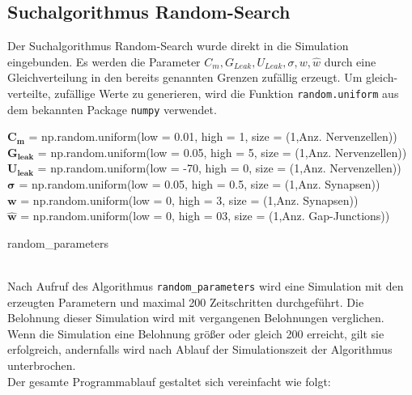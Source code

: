 	\subsection{Suchalgorithmus Random-Search}
		Der Suchalgorithmus Random-Search wurde direkt in die Simulation eingebunden. Es werden die Parameter $C_m, G_{Leak}, U_{Leak}, \sigma, w, \hat{w}$ durch eine Gleichverteilung in den bereits genannten Grenzen zufällig erzeugt. Um gleich-verteilte, zufällige Werte zu generieren, wird die Funktion \texttt{random.uniform} aus dem bekannten Package \texttt{numpy} \cite{NumPy} verwendet.\\
		\begin{algorithm}
			
				$\boldsymbol{C_m}$ = np.random.uniform(low = 0.01, high = 1, size = (1,Anz. Nervenzellen))\\
				$\boldsymbol{G_{leak}}$ = np.random.uniform(low = 0.05, high = 5, size = (1,Anz. Nervenzellen))\\
				$\boldsymbol{U_{leak}}$ = np.random.uniform(low = -70, high = 0, size = (1,Anz. Nervenzellen))\\
				$\boldsymbol{\sigma}$ = np.random.uniform(low = 0.05, high = 0.5, size = (1,Anz. Synapsen))\\
				$\boldsymbol{w}$ = np.random.uniform(low = 0, high = 3, size = (1,Anz. Synapsen))\\
				$\boldsymbol{\hat{w}}$ = np.random.uniform(low = 0, high = 03, size = (1,Anz. Gap-Junctions))
			\caption{random\_parameters}
		\end{algorithm}\\
		Nach Aufruf des Algorithmus \texttt{random\_parameters} wird eine Simulation mit den erzeugten Parametern und maximal 200 Zeitschritten durchgeführt. Die Belohnung dieser Simulation wird mit vergangenen Belohnungen verglichen. Wenn die Simulation eine Belohnung größer oder gleich 200 erreicht, gilt sie erfolgreich, andernfalls wird nach Ablauf der Simulationszeit der Algorithmus unterbrochen.\\
		Der gesamte Programmablauf gestaltet sich vereinfacht wie folgt:
